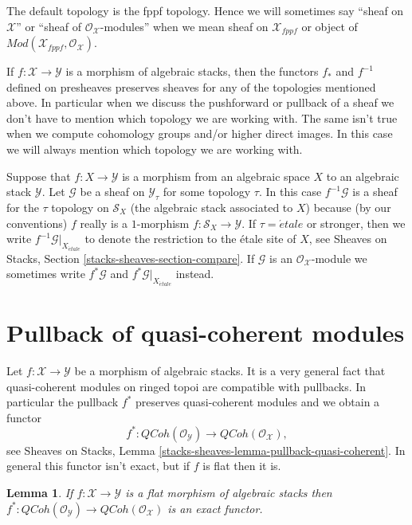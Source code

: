 \documentclass{stacks-project}
\theoremstyle{plain}
\newtheorem{lemma}[subsection]{Lemma}
\theoremstyle{definition}
\theoremstyle{remark}
\numberwithin{equation}{subsection}
\def\etale{{\acute{e}tale}}
\def\QCoh{\mathit{QCoh}}
\begin{document}
\medskip\noindent
The default topology is the fppf topology. Hence we will sometimes
say ``sheaf on $\mathcal{X}$'' or ``sheaf of $\mathcal{O}_\mathcal{X}$-modules''
when we mean sheaf on $\mathcal{X}_{fppf}$ or object of
$\textit{Mod}(\mathcal{X}_{fppf}, \mathcal{O}_\mathcal{X})$.

\medskip\noindent
If $f : \mathcal{X} \to \mathcal{Y}$ is a morphism of algebraic
stacks, then the functors $f_*$ and $f^{-1}$ defined on presheaves
preserves sheaves for any of the topologies mentioned above. In particular
when we discuss the pushforward or pullback of a sheaf we don't have to
mention which topology we are working with. The same isn't true
when we compute cohomology groups and/or higher direct images. In this
case we will always mention which topology we are working with.

\medskip\noindent
Suppose that $f : X \to \mathcal{Y}$ is a morphism from an algebraic
space $X$ to an algebraic stack $\mathcal{Y}$. Let $\mathcal{G}$ be
a sheaf on $\mathcal{Y}_\tau$ for some topology $\tau$. In this case
$f^{-1}\mathcal{G}$ is a sheaf for the $\tau$ topology on $\mathcal{S}_X$
(the algebraic stack associated to $X$) because (by our conventions) $f$
really is a $1$-morphism $f : \mathcal{S}_X \to \mathcal{Y}$.
If $\tau = \etale$ or stronger, then we write
$f^{-1}\mathcal{G}|_{X_\etale}$
to denote the restriction to the \'etale site of $X$, see
Sheaves on Stacks, Section \ref{stacks-sheaves-section-compare}.
If $\mathcal{G}$ is an $\mathcal{O}_\mathcal{X}$-module we sometimes
write $f^*\mathcal{G}$ and $f^*\mathcal{G}|_{X_\etale}$
instead.




\section{Pullback of quasi-coherent modules}
\label{section-pullback}

\noindent
Let $f : \mathcal{X} \to \mathcal{Y}$ be a morphism of algebraic stacks.
It is a very general fact that quasi-coherent modules on ringed topoi
are compatible with pullbacks. In particular the pullback $f^*$ preserves
quasi-coherent modules and we obtain a functor
$$
f^* :
\QCoh(\mathcal{O}_\mathcal{Y})
\longrightarrow
\QCoh(\mathcal{O}_\mathcal{X}),
$$
see Sheaves on Stacks, Lemma
\ref{stacks-sheaves-lemma-pullback-quasi-coherent}.
In general this functor isn't exact, but if $f$ is flat then it is.

\begin{lemma}
\label{lemma-flat-pullback-quasi-coherent}
If $f : \mathcal{X} \to \mathcal{Y}$ is a flat morphism of algebraic stacks
then $f^* : \QCoh(\mathcal{O}_\mathcal{Y}) \to
\QCoh(\mathcal{O}_\mathcal{X})$ is an exact functor.
\end{lemma}
\end{document}
